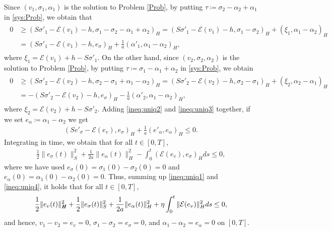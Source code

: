 \documentclass[11pt, a4paper]{article}
\newcommand{\defeq}{\coloneqq}
\newcommand{\E}{{\mathcal{E}}}
\newcommand{\bm}[1]{\textbf{\textit{#1}}}%
\newcommand{\Hv}{{\bm{H}}}
\newcommand{\Hs}{{H}}
\begin{document}
Since $(v_1, \sigma_1, \alpha_1)$ is the solution to Problem \ref{Prob}, by putting $\tau \defeq \sigma_2 - \alpha_2 + \alpha_1$ in \eqref{sys:Prob}, we obtain that 
\begin{align}\label{ineq:uniq2}\begin{aligned}
    0 &\ge \left(S\sigma'_1 - \E(v_1) - h,\sigma_1 - \sigma_2 - \alpha_1 + \alpha_2\right)_\Hs
    = \left(S\sigma'_1 - \E(v_1) - h,\sigma_1 - \sigma_2\right)_\Hs
    + \left(\xi_1, \alpha_1 - \alpha_2\right)_\Hs\\
    &= \left(S\sigma'_1 - \E(v_1) - h,e_\sigma\right)_\Hs
    + \frac{1}{a}\left(\alpha'_1, \alpha_1 - \alpha_2\right)_\Hs,
\end{aligned}\end{align}
where $\xi_1 = \E(v_1) + h - S\sigma'_1$.
On the other hand, since $(v_2, \sigma_2, \alpha_2)$ is the solution to Problem \ref{Prob}, by putting $\tau \defeq \sigma_1 - \alpha_1 + \alpha_2$ in \eqref{sys:Prob}, we obtain 
\begin{align}\label{ineq:uniq3}\begin{aligned}
    0 &\ge \left(S\sigma'_2 - \E(v_2) - h,\sigma_2 - \sigma_1 + \alpha_1 - \alpha_2\right)_\Hs
    = \left(S\sigma'_2 - \E(v_2) - h,\sigma_2 - \sigma_1\right)_\Hs
    + \left(\xi_2, \alpha_2 - \alpha_1\right)_\Hs\\
    &= -\left(S\sigma'_2 - \E(v_2) - h,e_\sigma\right)_\Hs
    - \frac{1}{a}\left(\alpha'_2, \alpha_1 - \alpha_2\right)_\Hs,
\end{aligned}\end{align}
where $\xi_2 = \E(v_2) + h - S\sigma'_2$.
Adding \eqref{ineq:uniq2} and \eqref{ineq:uniq3} together, if we set $e_\alpha\defeq \alpha_1 - \alpha_2$ we get
\begin{align*}
    \left(Se'_\sigma-\E(e_v),e_\sigma\right)_\Hs
    + \frac{1}{a}\left(e'_\alpha, e_\alpha\right)_\Hs \le 0.
\end{align*}
Integrating in time, we obtain that for all $t\in[0,T]$,
\begin{align}\label{ineq:uniq4}
    \frac{1}{2}\|e_\sigma(t)\|_S^2 + \frac{1}{2a}\|e_\alpha(t)\|_\Hs^2
    - \int_0^t\left(\E(e_v),e_\sigma\right)_\Hs ds \le 0,
\end{align}
where we have used $e_\sigma(0) = \sigma_1(0) - \sigma_2(0) = 0$ and $e_\alpha(0) = \alpha_1(0) - \alpha_2(0) = 0$. Thus, summing up \eqref{ineq:uniq1} and \eqref{ineq:uniq4}, it holds that for all $t\in[0,T]$, 
\[
    \frac{1}{2}\|e_v(t)\|_\Hv^2 
    + \frac{1}{2}\|e_\sigma(t)\|_S^2
    + \frac{1}{2a}\|e_\alpha(t)\|_\Hs^2
    + \eta\int_0^t\|\E(e_v)\|_\Hs^2ds \le 0,
\]
and hence, $v_1-v_2 = e_v = 0$, $\sigma_1-\sigma_2 = e_\sigma = 0$, and $\alpha_1 - \alpha_2 = e_\alpha = 0$ on $[0,T]$.
\end{document}

